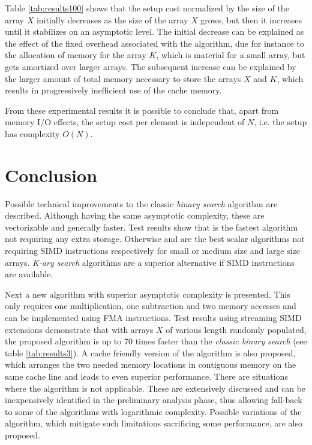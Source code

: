 \documentclass[preprint,1p,times]{elsarticle}
\begin{document}
Table \ref{tab:results100} shows that the setup cost normalized by the size of the array $X$ initially decreases as the size of the array $X$ grows, but then it increases until it stabilizes on an asymptotic level.
The initial decrease can be explained as the effect of the fixed overhead associated with the algorithm, due for instance to the allocation of memory for the array $K$, which is material for a small array, but gets amortized over larger arrays. 
The subsequent increase can be explained by the larger amount of total memory necessary to store the arrays $X$ and $K$, which results in progressively inefficient use of the cache memory.

From these experimental results it is possible to conclude that, apart from memory I/O effects, the setup cost per element is independent of $N$, i.e. the setup has complexity $O(N)$.



\section{Conclusion}
Possible technical improvements to the classic \textit{binary search} algorithm are described. Although having the same asymptotic complexity, these are vectorizable and generally faster. Test results show that \textit{\ClassicOffsetName} is the fastest algorithm not requiring any extra storage. Otherwise \textit{\BitSetName} and \textit{\EytzingerName} are the best scalar algorithms not requiring SIMD instructions respectively for small or medium size and large size arrays. \textit{K-ary search} algorithms are a superior alternative if SIMD instructions are available.

Next a new algorithm with superior asymptotic complexity is presented. This only requires one multiplication, one subtraction and two memory accesses and can be implemented using FMA instructions. Test results using streaming SIMD extensions demonstrate that with arrays $X$ of various length randomly populated, the proposed algorithm is up to 70 times faster than the \textit{classic binary search} (see table \ref{tab:results3}). A cache friendly version of the algorithm is also proposed, which arranges the two needed memory locations in contiguous memory on the same cache line and leads to even superior performance. There are situations where the algorithm is not applicable. These are extensively discussed and can be inexpensively identified in the preliminary analysis phase, thus allowing fall-back to some of the algorithms with logarithmic complexity. Possible variations of the algorithm, which mitigate such limitations sacrificing some performance, are also proposed.
\end{document}

